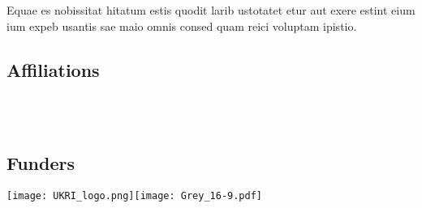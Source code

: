\documentclass[
]{ImperialPoster}
\begin{document}
\begin{multicols}{3}
	Equae es nobissitat hitatum estis quodit larib ustotatet etur aut exere estint eium ium expeb usantis sae maio omnis consed quam reici voluptam ipistio.
	
	\subsection{Affiliations}
	
	\\
	\\
	
	\subsection{Funders}
	
	\texttt{[image: UKRI\_logo.png]}\hfill\texttt{[image: Grey\_16-9.pdf]} %
	

\end{multicols}


\newpage

\titlesection %
\end{document}
